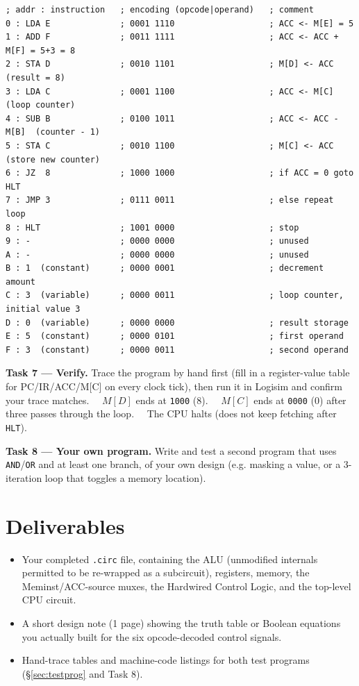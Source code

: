 \documentclass[11pt,a4paper]{article}
\newcommand{\task}[1]{\par\vspace{4pt}\noindent\textbf{Task #1}}
\newcommand{\checkoff}{\raisebox{-0.1em}{$\square$}\ }
\begin{document}
\begin{lstlisting}
; addr : instruction   ; encoding (opcode|operand)   ; comment
0 : LDA E              ; 0001 1110                   ; ACC <- M[E] = 5
1 : ADD F              ; 0011 1111                   ; ACC <- ACC + M[F] = 5+3 = 8
2 : STA D              ; 0010 1101                   ; M[D] <- ACC   (result = 8)
3 : LDA C              ; 0001 1100                   ; ACC <- M[C]   (loop counter)
4 : SUB B              ; 0100 1011                   ; ACC <- ACC - M[B]  (counter - 1)
5 : STA C              ; 0010 1100                   ; M[C] <- ACC   (store new counter)
6 : JZ  8              ; 1000 1000                   ; if ACC = 0 goto HLT
7 : JMP 3              ; 0111 0011                   ; else repeat loop
8 : HLT                ; 1001 0000                   ; stop
9 : -                  ; 0000 0000                   ; unused
A : -                  ; 0000 0000                   ; unused
B : 1  (constant)      ; 0000 0001                   ; decrement amount
C : 3  (variable)      ; 0000 0011                   ; loop counter, initial value 3
D : 0  (variable)      ; 0000 0000                   ; result storage
E : 5  (constant)      ; 0000 0101                   ; first operand
F : 3  (constant)      ; 0000 0011                   ; second operand
\end{lstlisting}

\task{7 --- Verify.} Trace the program by hand first (fill in a
register-value table for PC/IR/ACC/M[C] on every clock tick), then run it
in Logisim and confirm your trace matches. \checkoff\ $M[D]$ ends at
\texttt{1000} (8). \checkoff\ $M[C]$ ends at \texttt{0000} (0) after three
passes through the loop. \checkoff\ The CPU halts (does not keep fetching
after \texttt{HLT}).

\task{8 --- Your own program.} Write and test a second program that uses
\texttt{AND}/\texttt{OR} and at least one branch, of your own design (e.g.
masking a value, or a 3-iteration loop that toggles a memory location).

\section{Deliverables}

\begin{itemize}[nosep]
  \item Your completed \texttt{.circ} file, containing the ALU (unmodified
        internals permitted to be re-wrapped as a subcircuit), registers,
        memory, the Meminst/ACC-source muxes, the Hardwired Control Logic,
        and the top-level CPU circuit.
  \item A short design note (1 page) showing the truth table or Boolean
        equations you actually built for the six opcode-decoded control
        signals.
  \item Hand-trace tables and machine-code listings for both test programs
        (\S\ref{sec:testprog} and Task 8).
\end{itemize}
\end{document}
